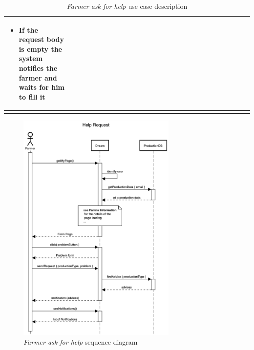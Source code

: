 \begin{enumerate}
\begin{longtable}{p{0.26\linewidth}p{0.75\linewidth}}
\begin{itemize}
            \item If the request body is empty the system notifies the farmer and waits for him to fill it
        \end{itemize}\\
        \bottomrule
        \caption{\emph{Farmer ask for help} use case description}
    \end{longtable}
    \begin{figure}[H]
        \begin{center}
        \includegraphics[width=0.7\textwidth]{sequence/HelpRequest.png}
        \caption{\emph{Farmer ask for help} sequence diagram}
        \label{fig:state6}
        \end{center}
    \end{figure}


\end{enumerate}
